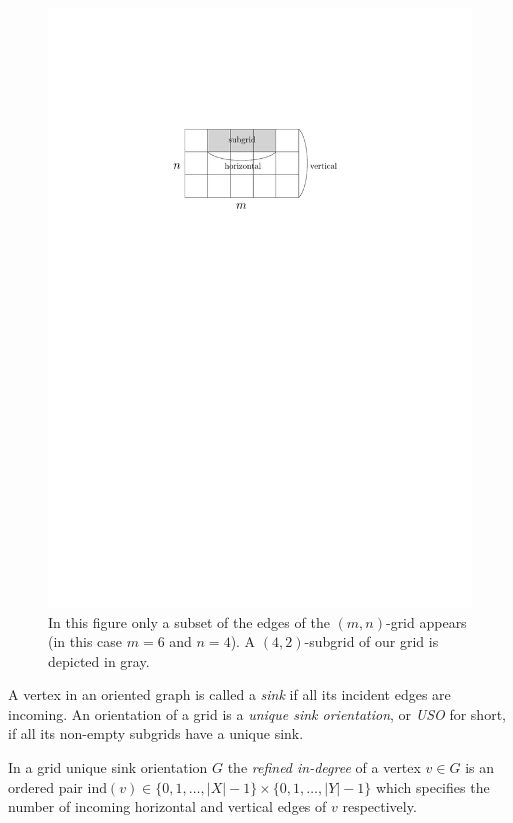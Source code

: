 \documentclass[a4paper,10pt]{article}
\newcommand{\indegree}{refined in-degree\xspace}
\newcommand{\ind}{\ensuremath{\mathrm{ind}}}
\begin{document}
  \begin{figure}[htbp] 
  	\centering
  	\includegraphics[scale=0.7]{examplegrid_fig.pdf}
  	\caption{In this figure only a subset of the edges of the $(m,n)$-grid appears (in this case $m=6$ and $n=4$). A $(4,2)$-subgrid of our grid is depicted in gray.} 
  	\label{fig:examplegrid}
  \end{figure}

A vertex in an oriented graph is called a \emph{sink} if all its incident edges are incoming.
An orientation of a grid is a \emph{unique sink orientation}, or \emph{USO}
for short, if all its non-empty subgrids have a unique sink.

In a grid unique sink orientation $G$ the \emph{\indegree} of a vertex $v \in G$ is an ordered pair $\ind (v) \in \{0,1,\ldots,|X|-1\}\times \{0,1,\ldots,|Y|-1\}$ which specifies the number of incoming horizontal and vertical edges of $v$ respectively. 
\end{document}
